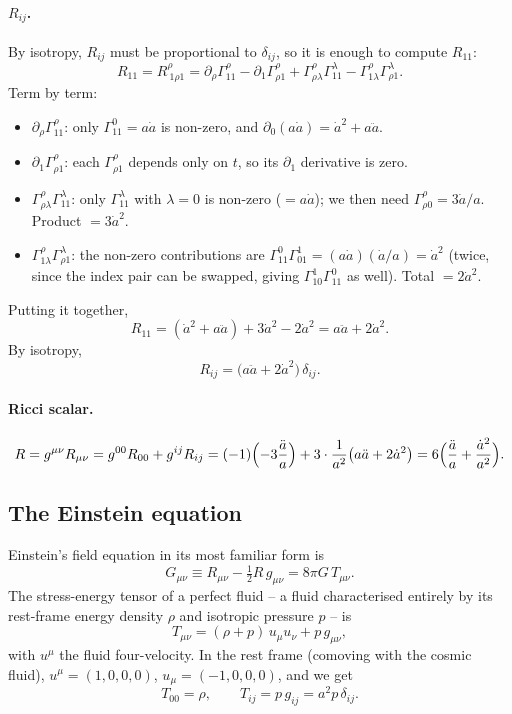 \paragraph{$R_{ij}$.} By isotropy, $R_{ij}$ must be proportional to $\delta_{ij}$, so it is enough to compute $R_{11}$:
\[
  R_{11} = R^\rho_{\ 1\rho 1} = \partial_\rho \Gamma^\rho_{11} - \partial_1 \Gamma^\rho_{\rho 1} + \Gamma^\rho_{\rho\lambda}\Gamma^\lambda_{11} - \Gamma^\rho_{1\lambda}\Gamma^\lambda_{\rho 1}.
\]
Term by term:
\begin{itemize}
  \item $\partial_\rho \Gamma^\rho_{11}$: only $\Gamma^0_{11} = a\dot{a}$ is non-zero, and $\partial_0(a\dot{a}) = \dot{a}^2 + a\ddot{a}$.
  \item $\partial_1 \Gamma^\rho_{\rho 1}$: each $\Gamma^\rho_{\rho 1}$ depends only on $t$, so its $\partial_1$ derivative is zero.
  \item $\Gamma^\rho_{\rho\lambda}\Gamma^\lambda_{11}$: only $\Gamma^\lambda_{11}$ with $\lambda = 0$ is non-zero ($= a\dot{a}$); we then need $\Gamma^\rho_{\rho 0} = 3\dot{a}/a$. Product $= 3\dot{a}^2$.
  \item $\Gamma^\rho_{1\lambda}\Gamma^\lambda_{\rho 1}$: the non-zero contributions are $\Gamma^0_{11}\Gamma^1_{01} = (a\dot{a})(\dot{a}/a) = \dot{a}^2$ (twice, since the index pair can be swapped, giving $\Gamma^1_{10}\Gamma^0_{11}$ as well). Total $= 2\dot{a}^2$.
\end{itemize}
Putting it together,
\[
  R_{11} = (\dot{a}^2 + a\ddot{a}) + 3\dot{a}^2 - 2\dot{a}^2 = a\ddot{a} + 2\dot{a}^2.
\]
By isotropy,
\begin{equation}
  R_{ij} = \bigl(a\ddot{a} + 2\dot{a}^2\bigr)\, \delta_{ij}.
  \label{eq:Rij}
\end{equation}

\paragraph{Ricci scalar.}
\[
  R = g^{\mu\nu} R_{\mu\nu} = g^{00} R_{00} + g^{ij} R_{ij}
    = (-1)\Bigl(-3\frac{\ddot a}{a}\Bigr) + 3\cdot\frac{1}{a^2}\bigl(a\ddot{a} + 2\dot{a}^2\bigr)
    = 6\Bigl(\frac{\ddot a}{a} + \frac{\dot a^2}{a^2}\Bigr).
\]

\subsection{The Einstein equation}

Einstein's field equation in its most familiar form is
\[
  G_{\mu\nu} \equiv R_{\mu\nu} - \tfrac{1}{2} R\, g_{\mu\nu} = 8\pi G\, T_{\mu\nu}.
\]
The stress-energy tensor of a perfect fluid -- a fluid characterised entirely by its rest-frame energy density $\rho$ and isotropic pressure $p$ -- is
\[
  T_{\mu\nu} = (\rho + p)\, u_\mu u_\nu + p\, g_{\mu\nu},
\]
with $u^\mu$ the fluid four-velocity. In the rest frame (comoving with the cosmic fluid), $u^\mu = (1, 0, 0, 0)$, $u_\mu = (-1, 0, 0, 0)$, and we get
\[
  T_{00} = \rho, \qquad T_{ij} = p\, g_{ij} = a^2 p\, \delta_{ij}.
\]

